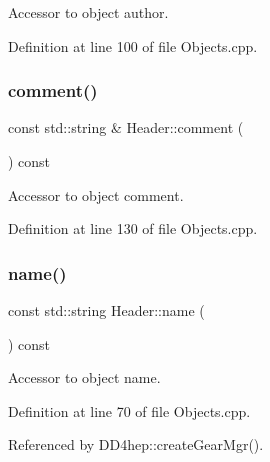 Accessor to object author. 



Definition at line 100 of file Objects.\+cpp.

\hypertarget{class_d_d4hep_1_1_geometry_1_1_header_a64fb8a0dfb8ead8fbbda407d824c00ac}{}\label{class_d_d4hep_1_1_geometry_1_1_header_a64fb8a0dfb8ead8fbbda407d824c00ac} 
\subsubsection{\texorpdfstring{comment()}{comment()}}
{\footnotesize\ttfamily const std\+::string \& Header\+::comment (\begin{DoxyParamCaption}{ }\end{DoxyParamCaption}) const}



Accessor to object comment. 



Definition at line 130 of file Objects.\+cpp.

\hypertarget{class_d_d4hep_1_1_geometry_1_1_header_a03877a8fa5ca87fc1d8b73984761e345}{}\label{class_d_d4hep_1_1_geometry_1_1_header_a03877a8fa5ca87fc1d8b73984761e345} 
\subsubsection{\texorpdfstring{name()}{name()}}
{\footnotesize\ttfamily const std\+::string Header\+::name (\begin{DoxyParamCaption}{ }\end{DoxyParamCaption}) const}



Accessor to object name. 



Definition at line 70 of file Objects.\+cpp.



Referenced by D\+D4hep\+::create\+Gear\+Mgr().

\hypertarget{class_d_d4hep_1_1_geometry_1_1_header_acc0a56dbbdcf868bccd82d1bc8216821}{}\label{class_d_d4hep_1_1_geometry_1_1_header_acc0a56dbbdcf868bccd82d1bc8216821} 
